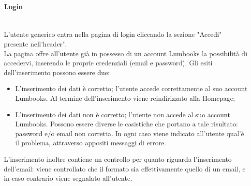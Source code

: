 \paragraph{Login}\mbox{}\\
\label{par:Login}
L'utente generico entra nella pagina di login cliccando la sezione "Accedi" presente nell'header".\\
La pagina offre all'utente già in possesso di un account Lumbooks la possibilità di accedervi, inserendo le proprie credenziali (email e password). Gli esiti dell'inserimento possono essere due:
\begin{itemize}
	\item L'inserimento dei dati è corretto; l'utente accede correttamente al suo account Lumbooks. Al termine dell'inserimento viene reindirizzato alla Homepage;
	\item L'inserimento dei dati non è corretto; l'utente non accede al suo account Lumbooks. Possono essere diverse le casistiche che portano a tale risultato: password e/o email non corretta. In ogni caso viene indicato all'utente qual'è il problema, attraverso appositi messaggi di errore. 
\end{itemize}
L'inserimento inoltre contiene un controllo per quanto riguarda l'inserimento dell'email: viene controllato che il formato sia effettivamente quello di un email, e in caso contrario viene segnalato all'utente.



